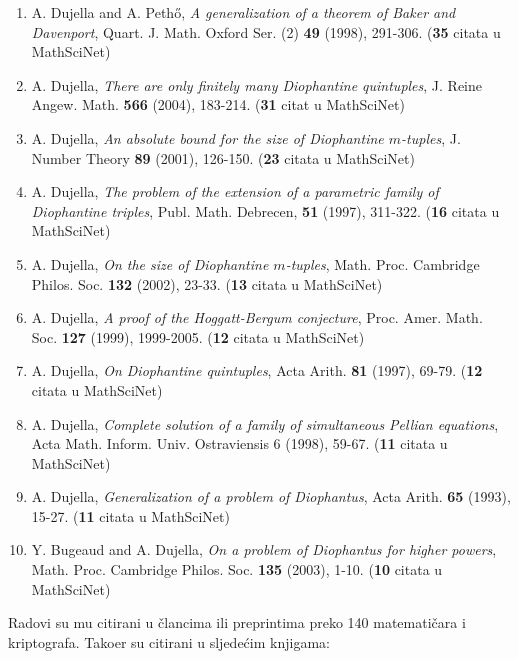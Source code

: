 \documentclass[11pt]{report}
\begin{document}
\begin{enumerate}
\item A. Dujella and A. Peth\H{o}, {\it A generalization of a theorem of Baker and Davenport},
Quart. J. Math. Oxford Ser. (2) {\bf 49} (1998), 291-306. ({\bf 35} citata u MathSciNet)
\item A. Dujella, {\it There are only finitely many Diophantine quintuples},
J. Reine Angew. Math. {\bf 566} (2004), 183-214. ({\bf 31} citat u MathSciNet)
\item A. Dujella, {\it An absolute bound for the size of Diophantine $m$-tuples},
J. Number Theory {\bf 89} (2001), 126-150. ({\bf 23} citata u MathSciNet)
\item A. Dujella, {\it The problem of the extension of a parametric family of Diophantine triples},
Publ. Math. Debrecen, {\bf 51} (1997), 311-322. ({\bf 16} citata u MathSciNet)
\item A. Dujella, {\it On the size of Diophantine $m$-tuples},
Math. Proc. Cambridge Philos. Soc. {\bf 132} (2002), 23-33. ({\bf 13} citata u MathSciNet)
\item A. Dujella, {\it A proof of the Hoggatt-Bergum conjecture},
Proc. Amer. Math. Soc. {\bf 127} (1999), 1999-2005. ({\bf 12} citata u MathSciNet)
\item A. Dujella, {\it On Diophantine quintuples}, Acta Arith. {\bf 81} (1997), 69-79.
({\bf 12} citata u MathSciNet)
\item A. Dujella, {\it Complete solution of a family of simultaneous Pellian equations},
Acta Math. Inform. Univ. Ostraviensis 6 (1998), 59-67. ({\bf 11} citata u MathSciNet)
\item A. Dujella, {\it Generalization of a problem of Diophantus}, Acta Arith. {\bf 65} (1993), 15-27.
({\bf 11} citata u MathSciNet)
\item Y. Bugeaud and A. Dujella, {\it On a problem of Diophantus for higher powers},
Math. Proc. Cambridge Philos. Soc. {\bf 135} (2003), 1-10. ({\bf 10} citata u MathSciNet)
\end{enumerate}

Radovi su mu citirani u \v{c}lancima ili preprintima preko 140
matemati\v{c}ara i kriptografa.
Tako\dj{}er su citirani u sljede\'{c}im knjigama:
\end{document}
